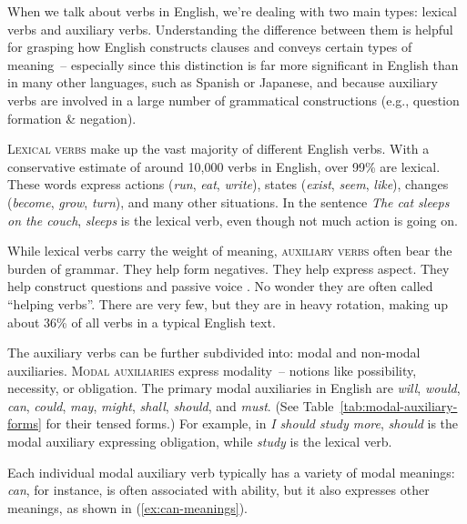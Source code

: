 \noindent When we talk about verbs in English, we're dealing with two main types: lexical verbs and auxiliary verbs. Understanding the difference between them is helpful for grasping how English constructs clauses and conveys certain types of meaning~-- especially since this distinction is far more significant in English than in many other languages, such as Spanish or Japanese, and because auxiliary verbs are involved in a large number of grammatical constructions (e.g., question formation \& negation).

\textsc{Lexical verbs} make up the vast majority of different English verbs. With a conservative estimate of around 10,000 verbs in English, over 99\% are lexical. These words express actions (\textit{run},\textit{ eat},\textit{ write}), states (\textit{exist},\textit{ seem},\textit{ like}), changes (\textit{become},\textit{ grow},\textit{ turn}), and many other situations. In the sentence \textit{The cat sleeps on the couch}, \textit{sleeps} is the lexical verb, even though not much action is going on.

While lexical verbs carry the weight of meaning, \textsc{auxiliary verbs} often bear the burden of grammar. They help form negatives. They help express aspect. They help construct questions and passive voice
. No wonder they are often called ``helping verbs''. There are very few, but they are in heavy rotation, making up about 36\% of all verbs in a typical English text.

The auxiliary verbs can be further subdivided into: modal and non-modal auxiliaries. \textsc{Modal auxiliaries} express modality~-- notions like possibility, necessity, or obligation. The primary modal auxiliaries in English are \textit{will},\textit{ would},\textit{ can},\textit{ could},\textit{ may},\textit{ might},\textit{ shall},\textit{ should}, and \textit{must}. (See Table~\ref{tab:modal-auxiliary-forms} for their tensed forms.) For example, in \textit{I should study more}, \textit{should} is the modal auxiliary expressing obligation, while \textit{study} is the lexical verb.

Each individual modal auxiliary verb typically has a variety of modal meanings: \textit{can}, for instance, is often associated with ability, but it also expresses other meanings, as shown in (\ref{ex:can-meanings}).

